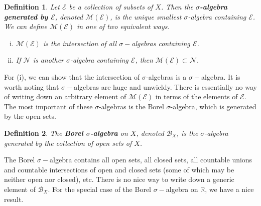 \documentclass[12pt]{amsart}         %
\newtheorem{definition}{Definition}[section]
\theoremstyle{remark}
\newcommand{\R}{\mathbb{R}}
\begin{document}
\begin{definition}Let $\mathcal{E}$ be a collection of subsets of $X$. Then the \textbf{$\sigma$-algebra generated by $\mathcal{E}$}, denoted $\mathcal{M}(\mathcal{E})$, is the unique smallest $\sigma$-algebra containing $\mathcal{E}$. We can define $\mathcal{M}(\mathcal{E})$ in one of two equivalent ways.
\begin{enumerate}[(i)]
\item $\mathcal{M}(\mathcal{E})$ is the intersection of all $\sigma-$algebras containing $\mathcal{E}$.
\item If $\mathcal{N}$ is another $\sigma$-algebra containing $\mathcal{E}$, then $\mathcal{M}(\mathcal{E}) \subset \mathcal{N}$.
\end{enumerate}
\end{definition}

For (i), we can show that the intersection of $\sigma$-algebras is a $\sigma-$algebra. It is worth noting that $\sigma-$algebras are huge and unwieldy. There is essentially no way of writing down an arbitrary element of $\mathcal{M}(\mathcal{E})$ in terms of the elements of $\mathcal{E}$. The most important of these $\sigma$-algebras is the Borel $\sigma$-algebra, which is generated by the open sets.

\begin{definition}
The \textbf{Borel $\sigma$-algebra} on $X$, denoted $\mathcal{B}_X$, is the $\sigma$-algebra generated by the collection of open sets of $X$.
\end{definition}

The Borel $\sigma-$algebra contains all open sets, all closed sets, all countable unions and countable intersections of open and closed sets (some of which may be neither open nor closed), etc. There is no nice way to write down a generic element of $\mathcal{B}_X$. For the special case of the Borel $\sigma-$algebra on $\R$, we have a nice result.
\end{document}
